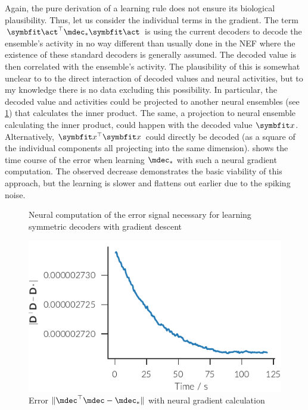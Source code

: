 Again, the pure derivation of a learning rule does not ensure its biological plausibility.
Thus, let us consider the individual terms in the gradient.
The term $\vc\act\Tr \mdec_* \vc\act$ is using the current decoders to decode the ensemble's activity in no way different than usually done in the NEF where the existence of these standard decoders is generally assumed.
The decoded value is then correlated with the ensemble's activity.
The plausibility of this is somewhat unclear to to the direct interaction of decoded values and neural activities, but to my knowledge there is no data excluding this possibility.
In particular, the decoded value and activities could be projected to another neural ensembles (see \cref{fig:aml-grad-desc}) that calculates the inner product.
The same, a projection to neural ensemble calculating the inner product, could happen with the decoded value $\vc x$.
Alternatively, $\vc x\Tr \vc x$ could directly be decoded (as a square of the individual components all projecting into the same dimension).
 shows the time course of the error when learning $\mdec_*$ with such a neural gradient computation.
The observed decrease demonstrates the basic viability of this approach, but the learning is slower and flattens out earlier due to the spiking noise.
\begin{figure}
    \centering
    \caption{Neural computation of the error signal necessary for learning symmetric decoders with gradient descent}\label{fig:aml-grad-desc}
\end{figure}
\begin{figure}
    \centering
    \includegraphics{figures/aml-neural-grad-err}
    \caption{Error $\lVert \mdec\Tr\mdec - \mdec_*\rVert$ with neural gradient calculation}\label{fig:aml:neural-grad-err}
\end{figure}


